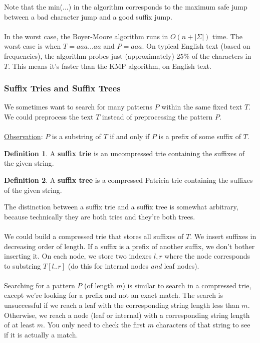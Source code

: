 \documentclass[]{article}
\theoremstyle{definition}
\newtheorem*{defn}{Definition}
\begin{document}
				Note that the min(...) in the algorithm corresponds to the maximum safe jump between a bad character jump and a good suffix jump.
				\\ \\
				In the worst case, the Boyer-Moore algorithm runs in $O(n + |\Sigma|)$ time. The worst case is when $T = aaa \ldots aa$ and $P = aaa$. On typical English text (based on frequencies), the algorithm probes just (approximately) 25\% of the characters in $T$. This means it's faster than the KMP algorithm, on English text.

			\subsubsection{Suffix Tries and Suffix Trees}
				We sometimes want to search for many patterns $P$ within the same fixed text $T$. We could preprocess the text $T$ instead of preprocessing the pattern $P$.
				\\ \\
				\underline{Observation}: $P$ is a substring of $T$ if and only if $P$ is a prefix of some suffix of $T$.

				\begin{defn}
					A \textbf{suffix trie} is an uncompressed trie containing the suffixes of the given string.
				\end{defn}

				\begin{defn}
					A \textbf{suffix tree} is a compressed Patricia trie containing the suffixes of the given string.
				\end{defn}

				The distinction between a suffix trie and a suffix tree is somewhat arbitrary, because technically they are both tries and they're both trees.
				\\ \\
				We could build a compressed trie that stores all suffixes of $T$. We insert suffixes in decreasing order of length. If a suffix is a prefix of another suffix, we don't bother inserting it. On each node, we store two indexes $l, r$ where the node corresponds to substring $T[l..r]$ (do this for internal nodes \emph{and} leaf nodes).
				\\ \\
				Searching for a pattern $P$ (of length $m$) is similar to search in a compressed trie, except we're looking for a prefix and not an exact match. The search is unsuccessful if we reach a leaf with the corresponding string length less than $m$. Otherwise, we reach a node (leaf or internal) with a corresponding string length of at least $m$. You only need to check the first $m$ characters of that string to see if it is actually a match.
\end{document}

